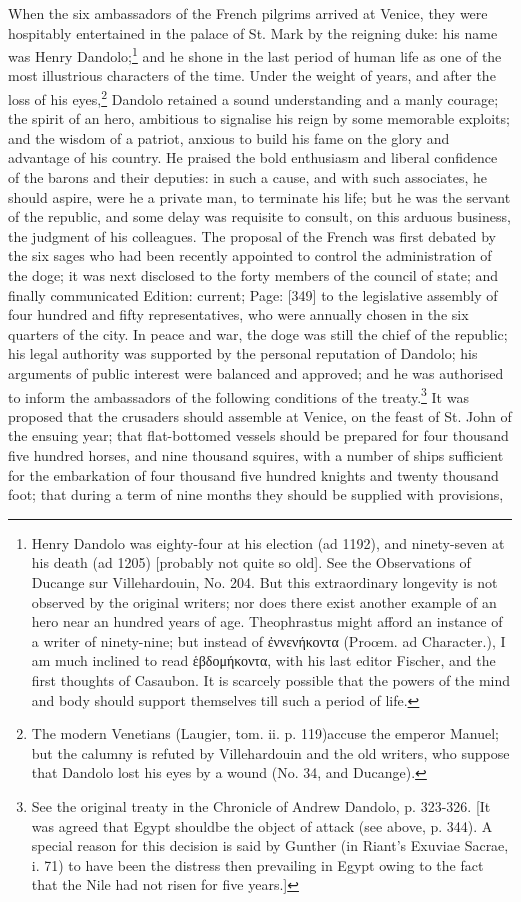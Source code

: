 When the six ambassadors of the French pilgrims arrived at Venice, they were hospitably entertained in the palace of St. Mark by the reigning duke: his name was Henry Dandolo;\footnote{Henry Dandolo was eighty-four at his election (ad 1192), and ninety-seven at his death (ad 1205) [probably not quite so old]. See the Observations of Ducange sur Villehardouin, No. 204. But this extraordinary longevity is not observed by the original writers; nor does there exist another example of an hero near an hundred years of age. Theophrastus might afford an instance of a writer of ninety-nine; but instead of \textgreek{\texthebrew{ἐ}ννενήκοντα} (Proœm. ad Character.), I am much inclined to read \textgreek{\texthebrew{ἑ}βδομήκοντα}, with his last editor Fischer, and the first thoughts of Casaubon. It is scarcely possible that the powers of the mind and body should support themselves till such a period of life.} and he shone in the last period of human life as one of the most illustrious characters of the time. Under the weight of years, and after the loss of his eyes,\footnote{The modern Venetians (Laugier, tom. ii. p. 119)accuse the emperor Manuel; but the calumny is refuted by Villehardouin and the old writers, who suppose that Dandolo lost his eyes by a wound (No. 34, and Ducange).} Dandolo retained a sound understanding and a manly courage; the spirit of an hero, ambitious to signalise his reign by some memorable exploits; and the wisdom of a patriot, anxious to build his fame on the glory and advantage of his country. He praised the bold enthusiasm and liberal confidence of the barons and their deputies: in such a cause, and with such associates, he should aspire, were he a private man, to terminate his life; but he was the servant of the republic, and some delay was requisite to consult, on this arduous business, the judgment of his colleagues. The proposal of the French was first debated by the six sages who had been recently appointed to control the administration of the doge; it was next disclosed to the forty members of the council of state; and finally communicated Edition: current; Page: [349] to the legislative assembly of four hundred and fifty representatives, who were annually chosen in the six quarters of the city. In peace and war, the doge was still the chief of the republic; his legal authority was supported by the personal reputation of Dandolo; his arguments of public interest were balanced and approved; and he was authorised to inform the ambassadors of the following conditions of the treaty.\footnote{See the original treaty in the Chronicle of Andrew Dandolo, p. 323-326. [It was agreed that Egypt shouldbe the object of attack (see above, p. 344). A special reason for this decision is said by Gunther (in Riant\texthebrew{}’s Exuviae Sacrae, i. 71) to have been the distress then prevailing in Egypt owing to the fact that the Nile had not risen for five years.]} It was proposed that the crusaders should assemble at Venice, on the feast of St. John of the ensuing year; that flat-bottomed vessels should be prepared for four thousand five hundred horses, and nine thousand squires, with a number of ships sufficient for the embarkation of four thousand five hundred knights and twenty thousand foot; that during a term of nine months they should be supplied with provisions, 